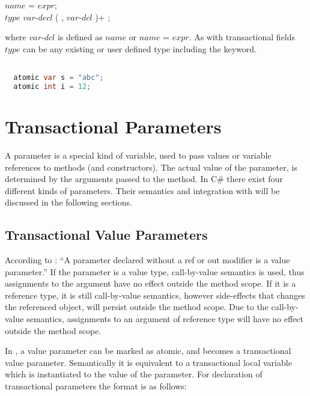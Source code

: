   $name$ = $expr$;\\
 $type$ $var$-$decl$ ( , $var$-$dcl$ )+ ; 

where $var$-$dcl$ is defined as $name$ or $name$ = $expr$. As with transactional fields $type$ can be any existing or user defined type including the  keyword.
\begin{lstlisting}[label=lst:local_variable,
  caption={Local Transactional Variable},
  language=Java,  
  showspaces=false,
  showtabs=false,
  breaklines=true,
  showstringspaces=false,
  breakatwhitespace=true,
  commentstyle=\color{greencomments},
  keywordstyle=\color{bluekeywords},
  stringstyle=\color{redstrings},
  morekeywords={atomic, retry, orElse, var, get, set}]  % Start your code-block

  atomic var s = "abc";
  atomic int i = 12;  
\end{lstlisting}

\section{Transactional Parameters}\label{sec:parameter_design}
A parameter is a special kind of variable, used to pass values or variable references to methods (and constructors). The actual value of the parameter, is determined by the arguments passed to the method\cite[p. 16]{csharp2013specificaiton}\cite[p. 14]{sestoft2011c}. In C\# there exist four different kinds of parameters. Their semantics and integration with \stmnamesp will be discussed in the following sections.


\subsection{Transactional Value Parameters}
According to \cite[p. 97]{csharp2013specificaiton}: ``A parameter declared without a ref or out modifier is a value parameter.'' If the parameter is a value type, call-by-value semantics is used, thus assignments to the argument have no effect outside the method scope. If it is a reference type, it is still call-by-value semantics, however side-effects that changes the referenced object, will persist outside the method scope. Due to the call-by-value semantics, assignments to an argument of reference type will have no effect outside the method scope\cite[p. 76]{sestoft2011c}.

In \stmnamesp, a value parameter can be marked as atomic, and becomes a transactional value parameter. Semantically it is equivalent to a transactional local variable which is instantiated to the value of the parameter.\cite[p. 76]{sestoft2011c} 
For declaration of transactional parameters the format is as follows:

